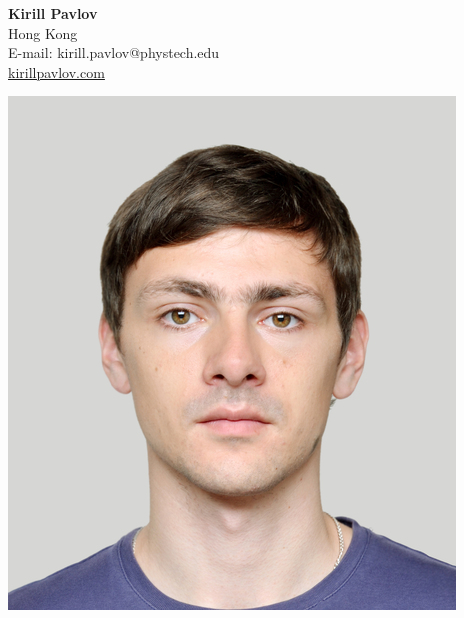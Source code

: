 \documentclass[letterpaper,11pt]{article}
\begin{document}
\parbox[b][2cm][t]{70mm}{
\textbf{\Large Kirill Pavlov} \\
Hong Kong \\
E-mail: kirill.pavlov@phystech.edu \\
\href{http://kirillpavlov.com}{kirillpavlov.com} \\
}
\hfill
\parbox[b][4.3cm][t]{60mm}{
\begin{flushright}
	\includegraphics{ukvisa}
\end{flushright}
}

\vspace{0.1in}
\end{document}
